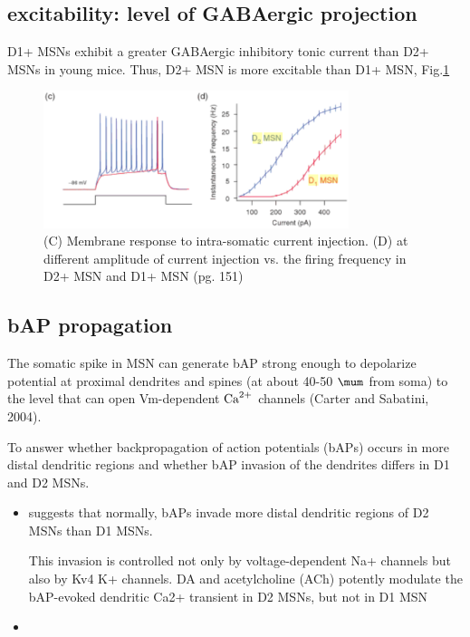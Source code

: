 \subsection{excitability: level of GABAergic projection }

D1+ MSNs exhibit a greater GABAergic inhibitory tonic current than D2+ MSNs in
young mice. Thus, D2+ MSN is more excitable than D1+ MSN,
Fig.\ref{fig:MSN-electrophysiology}

\begin{figure}[hbt]
 \centerline{\includegraphics[height=4cm]{./images/MSN-excitability.eps}}
\caption{(C) Membrane response to intra-somatic current injection. (D) at
different amplitude of current injection vs. the firing frequency in D2+ MSN
and D1+ MSN \citep{bjorklund2010}(pg. 151)}
\label{fig:MSN-electrophysiology}
\end{figure}


\subsection{bAP propagation}

The somatic spike in MSN can generate bAP strong enough to depolarize potential
at proximal dendrites and spines (at about 40-50 $\mum$ from soma) to the level
that can open Vm-dependent ${\text{Ca}^{2+}}$ channels (Carter and Sabatini, 2004).

To answer whether backpropagation of action potentials (bAPs) occurs in more
distal dendritic regions and whether bAP invasion of the dendrites differs in D1
and D2 MSNs.
\begin{itemize}
  \item \citep{day2008} suggests that normally, bAPs invade more distal
  dendritic regions of D2 MSNs than D1 MSNs. 
  
This  invasion is controlled not only by voltage-dependent Na+
channels but also by Kv4 K+ channels.
DA and acetylcholine (ACh) potently modulate the bAP-evoked
dendritic Ca2+ transient in D2 MSNs, but not in D1 MSN


  \item 
\end{itemize}

